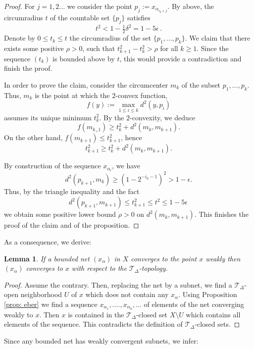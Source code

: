 \documentclass[12pt,leqno]{amsart}
\numberwithin{equation}{section}
\newtheorem{lem}[thm]{Lemma}
\theoremstyle{remark}
\begin{document}
\begin{proof}
For $j=1,2...$ we consider the point $p_j\mathrel{:=} x_{\alpha _{i_0+ j}}$. By above, the circumradius $t$
of the countable set $\{p_j\}$ satisfies 
$$t^2 < 1 -\tfrac 1 2 \delta ^2 = 1-5\epsilon \,.$$ 
Denote by $0\leq t_k \leq t$ the circumradius of the set $\{p_1,...,p_k\}$.
We claim that there exists some positive $\rho >0$, such that $t^2_{k+1}-t^2_k >\rho$ for all $k\geq 1$. Since the sequence $(t_k)$ is bounded above by $t$, this would provide a contradiction and finish the proof.

In order to prove the claim, consider the circumcenter $m_k$ of the subset $p_1,...,p_k$.
Thus, $m_k$ is the point at which the $2$-convex function, 
$$f(y)\mathrel{:=} \max_{1\leq i \leq k} d^2 (y,p_i)$$ 
assumes its unique minimum $t_k ^2$. By the $2$-convexity, we deduce
$$f(m_{k_+1}) \geq t_k ^2 + d^2 (m_k,m_{k+1}).$$
On the other hand, $f(m_{k+1}) \leq t^2_{k+1}$, hence 
$$t_{k+1} ^2 \geq t_k ^2 + d^2 (m_k,m_{k+1}).$$ 

By construction of the sequence $x_{\alpha_i}$, we have 
$$d^2(p_{k+1}, m_k) \geq (1- 2^{-i_0-1})^2 > 1 -\epsilon .$$
Thus, by the triangle inequality and the fact 
$$d^2 (p_{k+1} , m_{k+1}) \leq t_{k+1} ^2 \leq t^2 \leq 1-5\epsilon \,$$
we obtain some positive lower bound $\rho>0$ on $d^2(m_k,m_{k+1})$. 
This finishes the proof of the claim and of the proposition. 
\end{proof}

As a consequence, we derive: 

\begin{lem} \label{lem: h}
If a bounded net $(x_{\alpha})$ in $X$ converges to the point $x$ weakly then $(x_{\alpha})$ converges to $x$ with respect to the $\mathcal T_{\Delta}$-topology.
\end{lem} 

\begin{proof}
Assume the contrary.
Then, replacing the net by a subnet, we find a $\mathcal T_{\Delta}$-open neighborhood $U$ of $x$ which does not contain any $x_{\alpha}$. Using 
Proposition \ref{prop: eber} we find a sequence $x_{\alpha_1},....,x_{\alpha _k},...$ of elements of the net converging weakly to $x$. Then $x$ is contained in the $\mathcal T_{\Delta}$-closed set $X\setminus U$ which contains all elements of the sequence. This contradicts the definition of $\mathcal T_{\Delta}$-closed sets. 	
\end{proof}

Since any bounded net has weakly convergent subnets, we infer:
\end{document}
